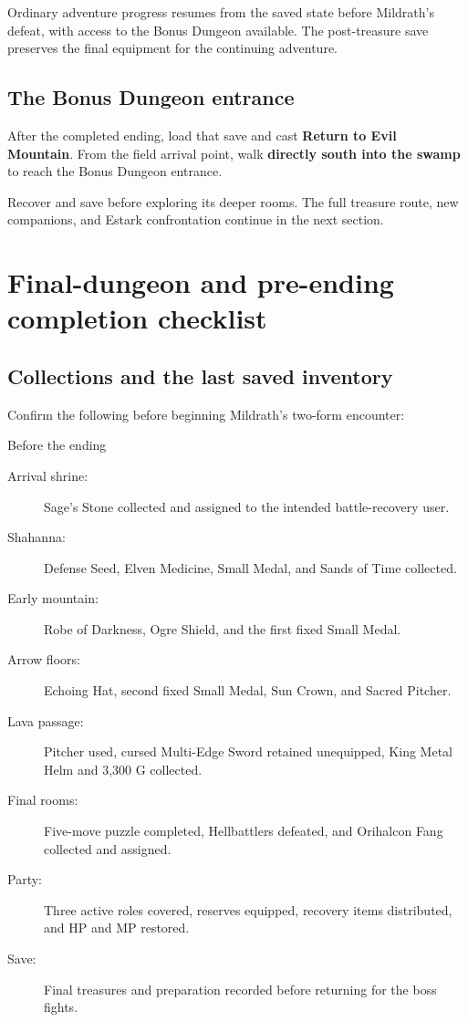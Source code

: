 Ordinary adventure progress resumes from the saved
state before Mildrath's defeat, with access to the
Bonus Dungeon available. The post-treasure save preserves
the final equipment for the continuing adventure.

\subsection*{The Bonus Dungeon entrance}

After the completed ending, load that save and cast
\textbf{Return to Evil Mountain}. From the field
arrival point, walk \textbf{directly south into the
swamp} to reach the Bonus Dungeon entrance.

Recover and save before exploring its deeper rooms.
The full treasure route, new companions, and Estark
confrontation continue in the next section.

\section{Final-dungeon and pre-ending completion checklist}

\subsection*{Collections and the last saved inventory}

Confirm the following before beginning Mildrath's
two-form encounter:
\begin{routecheck}{Before the ending}
\begin{description}
  \item[Arrival shrine:] Sage's Stone collected and assigned
    to the intended battle-recovery user.
  \item[Shahanna:] Defense Seed, Elven Medicine, Small Medal,
    and Sands of Time collected.
  \item[Early mountain:] Robe of Darkness, Ogre Shield,
    and the first fixed Small Medal.
  \item[Arrow floors:] Echoing Hat, second fixed Small Medal,
    Sun Crown, and Sacred Pitcher.
  \item[Lava passage:] Pitcher used, cursed Multi-Edge Sword
    retained unequipped, King Metal Helm and 3,300 G collected.
  \item[Final rooms:] Five-move puzzle completed, Hellbattlers
    defeated, and Orihalcon Fang collected and assigned.
  \item[Party:] Three active roles covered, reserves equipped,
    recovery items distributed, and HP and MP restored.
  \item[Save:] Final treasures and preparation recorded
    before returning for the boss fights.
\end{description}
\end{routecheck}

